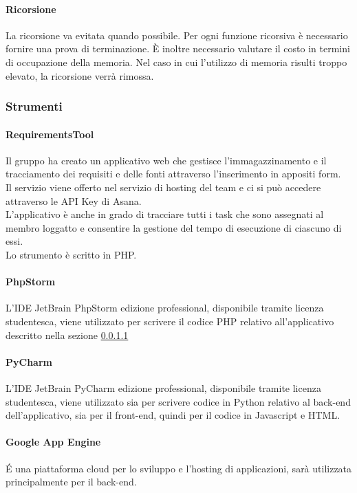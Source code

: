 			\paragraph{Ricorsione} %
			\label{par:ricorsione}
			La ricorsione va evitata quando possibile. Per ogni funzione ricorsiva è necessario fornire una prova di terminazione. È inoltre necessario valutare il costo in termini di occupazione della memoria. Nel caso in cui l’utilizzo di memoria risulti troppo elevato, la ricorsione verrà rimossa.
		
		\subsubsection{Strumenti}
		
			\paragraph{RequirementsTool}
			\label{par:requirements_tool}
			Il gruppo ha creato un applicativo web che gestisce l'immagazzinamento e il tracciamento dei requisiti e delle fonti attraverso l'inserimento in appositi form. \\
			Il servizio viene offerto nel servizio di hosting del team e ci si può accedere attraverso le API Key di Asana. \\
			L'applicativo è anche in grado di tracciare tutti i task che sono assegnati al membro loggatto e consentire la gestione del tempo di esecuzione di ciascuno di essi. \\
			Lo strumento è scritto in PHP.
			
			\paragraph{PhpStorm} %
			\label{par:php_storm}
			L'IDE JetBrain PhpStorm edizione professional, disponibile tramite licenza studentesca, viene utilizzato per scrivere il codice PHP relativo all'applicativo descritto nella sezione \ref{par:requirements_tool}
			\paragraph{PyCharm}
			L'IDE JetBrain PyCharm edizione professional, disponibile tramite licenza studentesca, viene utilizzato sia per scrivere codice in Python relativo al back-end dell'applicativo, sia per il front-end, quindi per il codice in Javascript e HTML.
			\paragraph{Google App Engine}
			\'E una piattaforma cloud per lo sviluppo e l'hosting di applicazioni, sarà utilizzata principalmente per il back-end.
